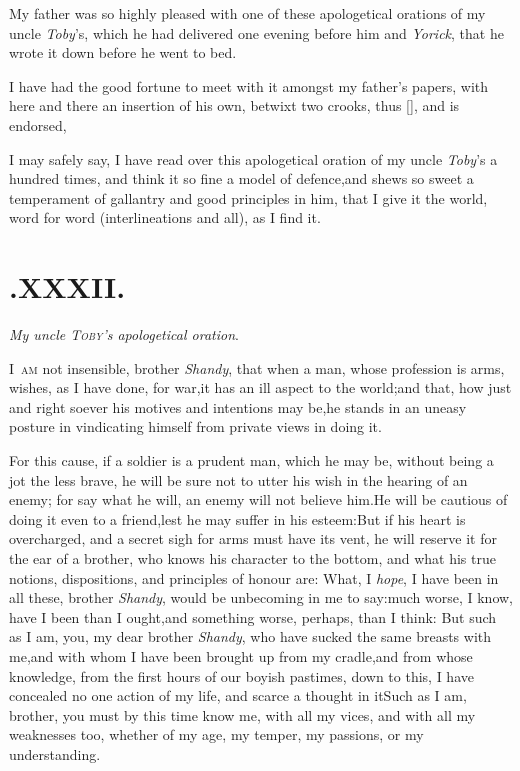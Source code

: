 \documentclass{article}
\begin{document}
My father was so highly pleased with one of these apologetical
orations of my uncle \textit{Toby}’s, which he had delivered
one evening before him and \textit{Yorick}, that he wrote it down
before he went to bed.

I have had the good fortune to meet with it amongst my
father’s papers, with here and there an insertion of his own,
betwixt two crooks, thus [\quad \quad ], and is
endorsed,

\noindent
{}

\noindent
I may safely say, I have read over this apologetical oration of
my uncle \textit{Toby}’s a hundred times, and think it so fine
a model of defence,\tsk and shews so sweet a temperament of
gallantry and good principles in him, that I give it the world,
word for word (interlineations and all), as I find it.

\section{.\enspace XXXII.}

\smallskip
\centerline{\textit{My  uncle {\normalshape \textsc{Toby}}’s apologetical  oration}.}

\vskip -9pt\etp

\lettrine{I}{\ am} not insensible, brother \textit{Shandy}, that when a man, whose
profession is arms, wishes, as I have done, for war,\tsk it has an ill aspect to the
world;\tsh and that, how just and right soever his motives and intentions may
be,\tsk he stands in an uneasy posture in vindicating himself from private views in
doing it.

For this cause, if a soldier is a prudent man, which he may be,
without being a jot the less brave, he will be sure not to utter
his wish in the hearing of an enemy; for say what he will, an enemy
will not believe him.\tsh He will be cautious of doing it
even to a friend,\tsk lest he may suffer in his
esteem:\tsh But if his heart is overcharged, and a secret
sigh for arms must have its vent, he will reserve it for the ear of
a brother, who knows his character to the bottom, and what his true
notions, dispositions, and principles of honour are: What, I \textit{hope}, I
have been in all these, brother \textit{Shandy}, would be unbecoming
in me to say:\tsh much worse, I know, have I been than I
ought,\tsk and something worse, perhaps, than I think: But such
as I am, you, my dear brother \textit{Shandy}, who have sucked the
same breasts with me,\tsk and with whom I have been
brought up from my cradle,\tsk and from whose knowledge, from the first hours of our
boyish pastimes, down to this, I have concealed no one action of my life, and scarce
a thought in it\tsh Such as I am, brother, you must by this time know me, with all
my vices, and with all my weaknesses too, whether of my age, my temper, my passions,
or my understanding.
\end{document}
